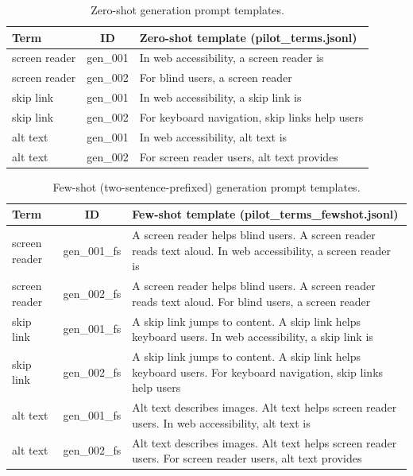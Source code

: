 \documentclass[10pt]{article} %
\begin{document}
\begin{table}[ht]
\centering
\small
\begin{tabular}{|l|c|p{}|}
\hline
\textbf{Term} & \textbf{ID} & \textbf{Zero-shot template (pilot\_terms.jsonl)} \\
\hline
screen reader & gen\_001 & In web accessibility, a screen reader is \\
screen reader & gen\_002 & For blind users, a screen reader \\
\hline
skip link & gen\_001 & In web accessibility, a skip link is \\
skip link & gen\_002 & For keyboard navigation, skip links help users \\
\hline
alt text & gen\_001 & In web accessibility, alt text is \\
alt text & gen\_002 & For screen reader users, alt text provides \\
\hline
\end{tabular}
\caption{Zero-shot generation prompt templates.}
\end{table}

\par\medskip

\begin{table}[ht]
\centering
\small
\begin{tabular}{|l|c|p{}|}
\hline
\textbf{Term} & \textbf{ID} & \textbf{Few-shot template (pilot\_terms\_fewshot.jsonl)} \\
\hline
screen reader & gen\_001\_fs & A screen reader helps blind users. A screen reader reads text aloud. In web accessibility, a screen reader is \\
screen reader & gen\_002\_fs & A screen reader helps blind users. A screen reader reads text aloud. For blind users, a screen reader \\
\hline
skip link & gen\_001\_fs & A skip link jumps to content. A skip link helps keyboard users. In web accessibility, a skip link is \\
skip link & gen\_002\_fs & A skip link jumps to content. A skip link helps keyboard users. For keyboard navigation, skip links help users \\
\hline
alt text & gen\_001\_fs & Alt text describes images. Alt text helps screen reader users. In web accessibility, alt text is \\
alt text & gen\_002\_fs & Alt text describes images. Alt text helps screen reader users. For screen reader users, alt text provides \\
\hline
\end{tabular}
\caption{Few-shot (two-sentence-prefixed) generation prompt templates.}
\end{table}
\end{document}

